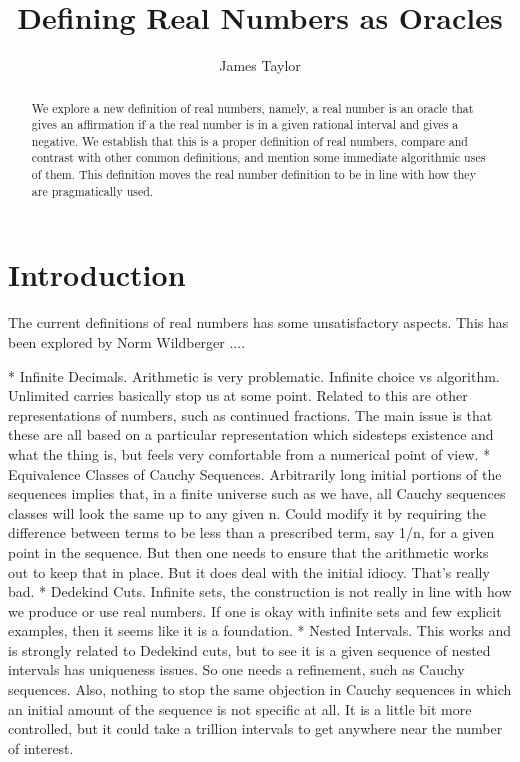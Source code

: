\documentclass[12pt]{article}
\title{Defining Real Numbers as Oracles}
\author{
  James Taylor
}
\newcommand{\1}{\mathbf{1}} %
\begin{document}
\maketitle
\begin{abstract}
We explore a new definition of real numbers, namely, a real number is an oracle that gives an affirmation if a the real number is in a given rational interval and gives a negative. We establish that this is a proper definition of real numbers, compare and contrast with other common definitions, and mention some immediate algorithmic uses of them. This definition moves the real number definition to be in line with how they are pragmatically used. 
\end{abstract}





\section{Introduction}


The current definitions of real numbers has some unsatisfactory aspects. This
has been explored by Norm Wildberger ....

* Infinite Decimals. Arithmetic is very problematic. Infinite choice vs
  algorithm. Unlimited carries basically stop us at some point. Related to
  this are other representations of numbers, such as continued fractions. The
  main issue is that these are all based on a particular representation which
  sidesteps existence and what the thing is, but feels very comfortable from a
  numerical point of view. 
* Equivalence Classes of Cauchy Sequences. Arbitrarily long initial portions
  of the sequences implies that, in a finite universe such as we have, all
  Cauchy sequences classes will look the same up to any given n. Could modify
  it by requiring the difference between terms to be less than a prescribed
  term, say 1/n, for a given point in the sequence. But then one needs to
  ensure that the arithmetic works out to keep that in place. But it does deal
  with the initial idiocy. That's really bad. 
* Dedekind Cuts. Infinite sets, the construction is not really in line with
  how we produce or use real numbers. If one is okay with infinite sets and
  few explicit examples, then it seems like it is a foundation. 
* Nested Intervals. This works and is strongly related to Dedekind cuts, but
  to see it is a given sequence of nested intervals has uniqueness issues. So
  one needs a refinement, such as Cauchy sequences. Also, nothing to stop the
  same objection in Cauchy sequences in which an initial amount of the
  sequence is not specific at all. It is a little bit more controlled, but it
  could take a trillion intervals to get anywhere near the number of interest. 
\end{document}
